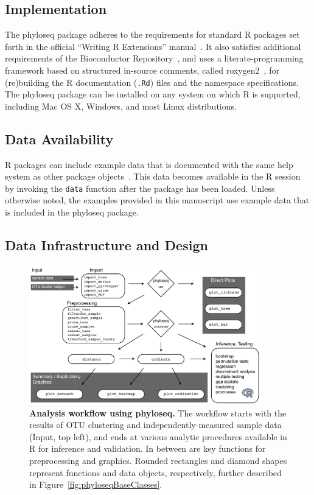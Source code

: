 \documentclass[10pt]{article}\usepackage{graphicx, color}
\newcommand{\R}{{\textsf{R}}}
\newcommand{\code}[1]{{\texttt{#1}}}
\begin{document}
\subsection*{Implementation}
The phyloseq package
adheres to the requirements for
standard \R{} packages set forth in the official
``Writing \R{} Extensions'' manual~\cite{Rext}. 
It also satisfies additional requirements
of the Bioconductor Repository~\cite{Bioconductor},
and uses a literate-programming framework based on 
structured in-source comments,
called roxygen2~\cite{roxygen2},
for (re)building the \R{} documentation (\code{.Rd}) files
and the namespace specifications.
The phyloseq package can be installed
on any system on which \R{} is supported, 
including Mac OS X, Windows, and most Linux distributions.

\subsection*{Data Availability}
\R{} packages can include example data
that is documented with the same help system
as other package objects~\cite{Rext}.
This data becomes available in the \R{} session
by invoking the \code{data} function
after the package has been loaded.
Unless otherwise noted, 
the examples provided in this manuscript use
example data that is included in the phyloseq package.


\subsection*{Data Infrastructure and Design}\label{sec:datainfrastructure}

\begin{figure}[!htbp]
\begin{center}
\includegraphics[width=0.9\textwidth]{phyloseq-summary-fig.pdf}
\end{center}
\caption{
{\bf Analysis workflow using phyloseq.}
The workflow starts with 
the results of OTU clustering and independently-measured sample data
(Input, top left),
and ends at various analytic procedures available in \R{}
for inference and validation.
In between are key functions for preprocessing and graphics.
Rounded rectangles and diamond shapes represent
functions and data objects, respectively,
further described in Figure~\ref{fig:phyloseqBaseClasses}.
}
\label{fig:phyloseqOverview}
\end{figure}
\end{document}
